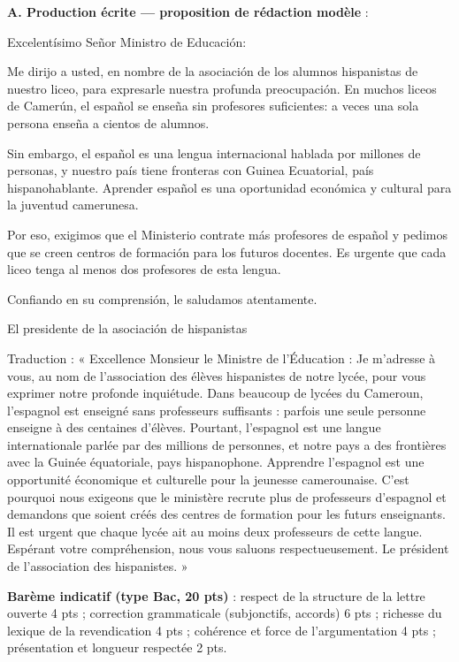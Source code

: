 \documentclass[11pt]{article}
\begin{document}
\begin{corrige}
\textbf{A. Production écrite — proposition de rédaction modèle} :

\begin{textebox}
Excelentísimo Señor Ministro de Educación:

Me dirijo a usted, en nombre de la asociación de los alumnos hispanistas de nuestro liceo, para expresarle nuestra profunda preocupación. En muchos liceos de Camerún, el español se enseña sin profesores suficientes: a veces una sola persona enseña a cientos de alumnos.

Sin embargo, el español es una lengua internacional hablada por millones de personas, y nuestro país tiene fronteras con Guinea Ecuatorial, país hispanohablante. Aprender español es una oportunidad económica y cultural para la juventud camerunesa.

Por eso, exigimos que el Ministerio contrate más profesores de español y pedimos que se creen centros de formación para los futuros docentes. Es urgente que cada liceo tenga al menos dos profesores de esta lengua.

Confiando en su comprensión, le saludamos atentamente.

El presidente de la asociación de hispanistas
\end{textebox}

Traduction : « Excellence Monsieur le Ministre de l'Éducation : Je m'adresse à vous, au nom de l'association des élèves hispanistes de notre lycée, pour vous exprimer notre profonde inquiétude. Dans beaucoup de lycées du Cameroun, l'espagnol est enseigné sans professeurs suffisants : parfois une seule personne enseigne à des centaines d'élèves. Pourtant, l'espagnol est une langue internationale parlée par des millions de personnes, et notre pays a des frontières avec la Guinée équatoriale, pays hispanophone. Apprendre l'espagnol est une opportunité économique et culturelle pour la jeunesse camerounaise. C'est pourquoi nous exigeons que le ministère recrute plus de professeurs d'espagnol et demandons que soient créés des centres de formation pour les futurs enseignants. Il est urgent que chaque lycée ait au moins deux professeurs de cette langue. Espérant votre compréhension, nous vous saluons respectueusement. Le président de l'association des hispanistes. »

\textbf{Barème indicatif (type Bac, 20 pts)} : respect de la structure de la lettre ouverte 4 pts ; correction grammaticale (subjonctifs, accords) 6 pts ; richesse du lexique de la revendication 4 pts ; cohérence et force de l'argumentation 4 pts ; présentation et longueur respectée 2 pts.


\end{corrige}
\end{document}
